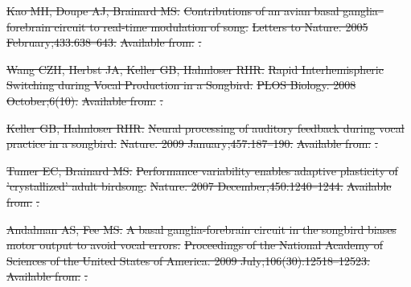 \documentclass[10pt,letterpaper]{article}
\providecommand{\DIFdeltex}[1]{{\protect\color{red}\sout{#1}}}                      %
\providecommand{\DIFdelbegin}{} %
\providecommand{\DIFdel}[1]{\texorpdfstring{\DIFdeltex{#1}}{}} %
\begin{document}
\begin{description}
 \end{description} 

\DIFdelbegin %

\DIFdel{Kao MH, Doupe AJ, Brainard MS.
}%
\DIFdel{Contributions of an avian basal ganglia--forebrain circuit to
  real-time modulation of song.
}%
\DIFdel{Letters to Nature. 2005 February;433:638--643.
}%
\DIFdel{Available from:
  }%
\DIFdel{.
}%

\DIFdel{Wang CZH, Herbst JA, Keller GB, Hahnloser RHR.
}%
\DIFdel{Rapid Interhemispheric Switching during Vocal Production in a
  Songbird.
}%
\DIFdel{PLOS Biology. 2008 October;6(10).
}%
\DIFdel{Available from:
  }%
\DIFdel{.
}%

\DIFdel{Keller GB, Hahnloser RHR.
}%
\DIFdel{Neural processing of auditory feedback during vocal practice in a
  songbird.
}%
\DIFdel{Nature. 2009 January;457:187--190.
}%
\DIFdel{Available from:
  }%
\DIFdel{.
}%

\DIFdel{Tumer EC, Brainard MS.
}%
\DIFdel{Performance variability enables adaptive plasticity of 'crystallized'
  adult birdsong.
}%
\DIFdel{Nature. 2007 December;450:1240--1244.
}%
\DIFdel{Available from:
  }%
\DIFdel{.
}%

\DIFdel{Andalman AS, Fee MS.
}%
\DIFdel{A basal ganglia-forebrain circuit in the songbird biases motor output
  to avoid vocal errors.
}%
\DIFdel{Proceedings of the National Academy of Sciences of the United States
  of America. 2009 July;106(30):12518--12523.
}%
\DIFdel{Available from:
  }%
\DIFdel{.
}%
\end{document}
